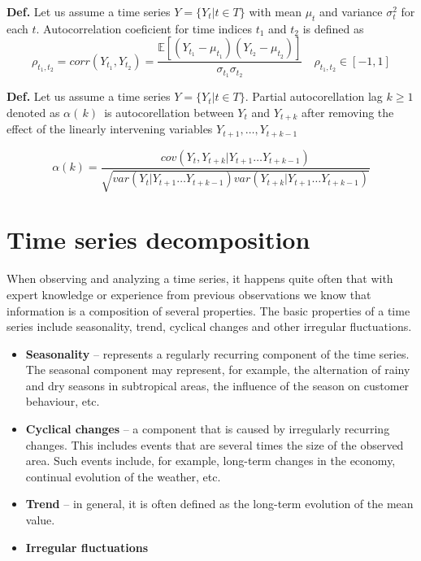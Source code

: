 \documentclass[thesis=M,english]{FITthesis}[2019/12/23]
\begin{document}
\noindent\textbf{Def.} Let us assume a time series $Y = \{Y_t |t \in T\}$ with mean $\mu_{t}$ and variance $\sigma_{t}^2$ for each $t$. Autocorrelation coeficient for time indices $t_{1}$ and $t_2$ is defined as 
\begin{equation*}
    \rho_{t_1,t_2} = corr(Y_{t_1}, Y_{t_2}) = \frac{\mathbb{E}[(Y_{t_1} - \mu_{t_1})(Y_{t_2} - \mu_{t_2})]}{\sigma_{t_1} \sigma_{t_2}} \quad \rho_{t_1,t_2} \in [-1,1]
\end{equation*}

\noindent\textbf{Def.} Let us assume a time series $Y = \{Y_t |t \in T\}$. Partial autocorellation lag $k \geq 1$ denoted as $\alpha( \,k)\,$ is autocorellation between $Y_t$ and $Y_{t+k}$ after removing the effect of the linearly intervening variables $Y_{t+1},\dots,Y_{t+k-1}$

\begin{equation*}
    \alpha(k) = \frac{ cov(Y_t,Y_{t+k}|{Y_{t+1}\dots Y_{t+k-1}}) }{\sqrt{
    var(Y_t|{Y_{t+1}\dots Y_{t+k-1}})var(Y_{t+k}|{Y_{t+1}\dots Y_{t+k-1}})}}
\end{equation*}

\newpage
\section{Time series decomposition}

When observing and analyzing a time series, it happens quite often that with expert knowledge or experience from previous observations we know that information is a composition of several properties. The basic properties of a time series include seasonality, trend, cyclical changes and other irregular fluctuations.
\begin{itemize}
		\item \textbf{Seasonality} -- represents a regularly recurring component of the time series. The seasonal component may represent, for example, the alternation of rainy and dry seasons in subtropical areas, the influence of the season on customer behaviour, etc.  
		\item \textbf{Cyclical changes} -- a component that is caused by irregularly recurring changes. This includes events that are several times the size of the observed area. Such events include, for example, long-term changes in the economy, continual evolution of the weather, etc.
		\item \textbf{Trend}  -- in general, it is often defined as the long-term evolution of the mean value.    
		\item \textbf{Irregular fluctuations} 
	\end{itemize}
\end{document}
